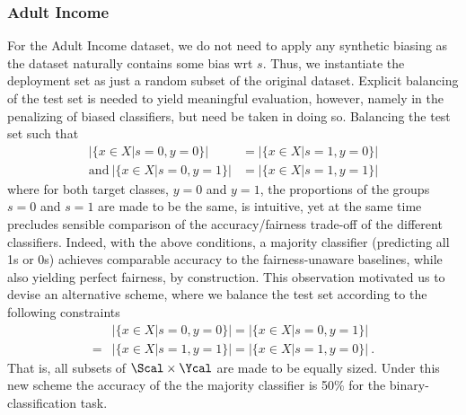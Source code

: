 \subsubsection{Adult Income}\label{ssec:dataset-construction-adult}
For the Adult Income dataset, we do not need to apply any synthetic biasing as the dataset naturally contains some bias wrt $s$. Thus, we instantiate the deployment set as just a random subset of the original dataset. Explicit balancing of the test set is needed to yield meaningful evaluation, however, namely in the penalizing of biased classifiers, but need be taken in doing so. Balancing the test set such that
\begin{align}
    |\{x \in X |s=0, y=0\}| &= |\{x \in X |s=1, y=0\}|    \nonumber\\
    \text{and}~|\{x \in X |s=0, y=1\}| &= |\{x \in X |s=1, y=1\}|
\end{align}
where for both target classes, $y=0$ and $y=1$, the proportions of the groups $s=0$ and $s=1$ are made to be the same, is intuitive, yet at the same time precludes sensible comparison of the accuracy/fairness trade-off of the different classifiers.
Indeed, with the above conditions, a majority classifier (predicting all 1s or 0s) achieves comparable accuracy to the fairness-unaware baselines, while also yielding perfect fairness, by construction.
This observation motivated us to devise an alternative scheme, where we balance the test set according to the following constraints
\begin{align}
    & |\{x \in X |s=0, y=0\}| 
    = |\{x \in X |s=0, y=1\}|  \nonumber \\
    = &|\{x \in X |s=1, y=1\}|
    = |\{x \in X |s=1, y=0\}|~.
 \end{align}
That is, all subsets of $\Scal \times \Ycal$ are made to be equally sized. Under this new scheme the accuracy of the the majority classifier is 50\% for the binary-classification task.


